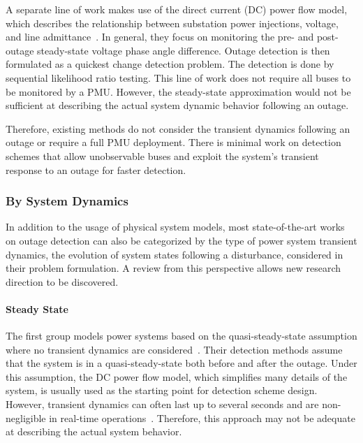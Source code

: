 A separate line of work makes use of the direct current (DC) power flow model, which describes the relationship between substation power injections, voltage, and line admittance~\cite{Chen2016,Babakmehr2016}. In general, they focus on monitoring the pre- and post-outage steady-state voltage phase angle difference. Outage detection is then formulated as a quickest change detection problem. The detection is done by sequential likelihood ratio testing. 
This line of work does not require all buses to be monitored by a PMU. However, the steady-state approximation would not be sufficient at describing the actual system dynamic behavior following an outage. 

Therefore, existing methods do not consider the transient dynamics following an outage or require a full PMU deployment. There is minimal work on detection schemes that allow unobservable buses and exploit the system's transient response to an outage for faster detection.

\subsubsection{By System Dynamics} %
\label{ssub:by_dynamics}

In addition to the usage of physical system models, most state-of-the-art works on outage detection can also be categorized by the type of power system transient dynamics, the evolution of system states following a disturbance, considered in their problem formulation. A review from this perspective allows new research direction to be discovered.

\paragraph{Steady State}
The first group models power systems based on the quasi-steady-state assumption where no transient dynamics are considered~\cite{Tate2008, tate2009double, babakmehr2015application,Chen2016, ardakanian2017event,Ardakanian2019a}. Their detection methods assume that the system is in a quasi-steady-state both before and after the outage. Under this assumption, the DC power flow model, which simplifies many details of the system, is usually used as the starting point for detection scheme design. However, transient dynamics can often last up to several seconds and are non-negligible in real-time operations~\cite{Glover2012}. Therefore, this approach may not be adequate at describing the actual system behavior. 


